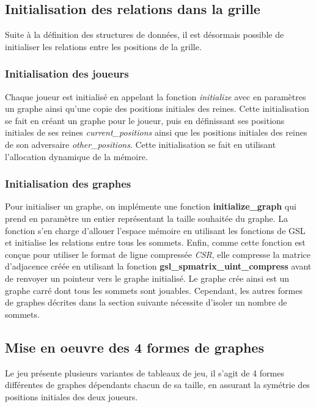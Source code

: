 \documentclass[11pt]{article}
\begin{document}
        \subsection{Initialisation des relations dans la grille}
            Suite à la définition des structures de données, il est désormais possible de initialiser les relations entre les positions de la grille.
            \subsubsection{Initialisation des joueurs}
           Chaque joueur est initialisé en appelant la fonction \textit{initialize} avec en paramètres un graphe ainsi qu'une copie des positions initiales des reines. Cette initialisation se fait en créant un graphe pour le joueur, puis en définissant ses positions initiales de ses reines \textit{current\_positions} ainsi que les positions initiales des reines de son adversaire \textit{other\_positions}. Cette initialisation se fait en utilisant l'allocation dynamique de la mémoire.
            \subsubsection{Initialisation des graphes}
            Pour initialiser un graphe, on implémente une fonction \textbf{initialize\_graph} qui prend en paramètre un entier représentant la taille souhaitée du graphe. La fonction s'en charge d'allouer l'espace mémoire en utilisant les fonctions de GSL et initialise les relations entre tous les sommets. Enfin, comme cette fonction est conçue pour utiliser le format de ligne compressée \textit{CSR}, elle compresse la matrice d'adjacence créée en utilisant la fonction \textbf{gsl\_spmatrix\_uint\_compress} avant de renvoyer un pointeur vers le graphe initialisé. Le graphe crée ainsi est un graphe carré dont tous les sommets sont jouables. Cependant, les autres formes de graphes décrites dans la section suivante nécessite d'isoler un nombre de sommets.

        \subsection{Mise en oeuvre des 4 formes de graphes}
        Le jeu présente plusieurs variantes de tableaux de jeu, il s'agit de 4 formes différentes de graphes dépendants chacun de sa taille, en assurant la symétrie des positions initiales des deux joueurs. 
\end{document}
